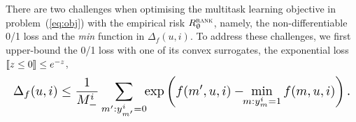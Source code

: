 %


There are two challenges %
when optimising the multitask learning objective in problem~(\ref{eq:obj}) 
with the empirical risk $R_{\uptheta}^{\textsc{rank}}$,
namely, the non-differentiable 0/1 loss and the \emph{min} function in %
$\Delta_f(u, i)$.
To address these challenges, we first upper-bound %
the 0/1 loss with one of its convex surrogates, %
\eg the exponential loss $\llbracket z \le 0 \rrbracket \le e^{-z}$,
\begin{equation*}
\resizebox{\columnwidth}{!}{$
\displaystyle 
\Delta_f(u, i) \le 
\frac{1}{M_-^i} \sum_{m': y_{m'}^i = 0} \!\! \exp \left(f(m', u, i) - \!\! \min_{m: y_m^i = 1} f(m, u, i) \right).
$}
\end{equation*}

